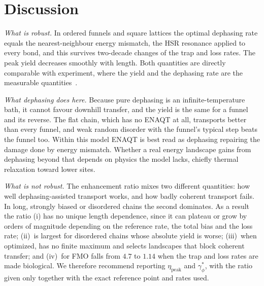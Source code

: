 \documentclass[aps,pre,preprint,floatfix]{revtex4-2}
\newcommand{\gps}{\gamma_\phi^*}
\newcommand{\etap}{\eta_\text{peak}}
\begin{document}
\section{\label{sec:discussion}Discussion}

\textit{What is robust.}
In ordered funnels and square lattices the optimal dephasing rate equals the
nearest-neighbour energy mismatch, the HSR resonance applied to every bond,
and this survives two-decade changes of the trap and loss rates.
The peak yield decreases smoothly with length.
Both quantities are directly comparable with experiment, where the yield and
the dephasing rate are the measurable quantities~\cite{maier2019}.

\textit{What dephasing does here.}
Because pure dephasing is an infinite-temperature bath, it cannot favour
downhill transfer, and the yield is the same for a funnel and its reverse.
The flat chain, which has no ENAQT at all, transports better than every funnel,
and weak random disorder with the funnel's typical step beats the funnel too.
Within this model ENAQT is best read as dephasing repairing the damage done by
energy mismatch.
Whether a real energy landscape gains from dephasing beyond that depends on
physics the model lacks, chiefly thermal relaxation toward lower sites.

\textit{What is not robust.}
The enhancement ratio mixes two different quantities: how well
dephasing-assisted transport works, and how badly coherent transport fails.
In long, strongly biased or disordered chains the second dominates.
As a result the ratio (i) has no unique length dependence, since it can
plateau or grow by orders of magnitude depending on the reference rate, the
total bias and the loss rate; (ii)~is largest for disordered chains whose
absolute yield is worse; (iii)~when optimized, has no finite maximum and
selects landscapes that block coherent transfer; and (iv)~for FMO falls from
$4.7$ to $1.14$ when the trap and loss rates are made biological.
We therefore recommend reporting $\etap$ and $\gps$, with the ratio given
only together with the exact reference point and rates used.
\end{document}
